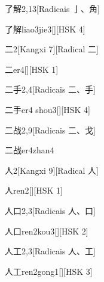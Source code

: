 \begin{entry}{了解}{2,13}[Radicais ⼅、⾓]
  \begin{phonetics}{了解}{liao3jie3}[][HSK 4]
  \end{phonetics}
\end{entry}

\begin{entry}{二}{2}[Kangxi 7][Radical ⼆]
  \begin{phonetics}{二}{er4}[][HSK 1]
  \end{phonetics}
\end{entry}

\begin{entry}{二手}{2,4}[Radicais ⼆、⼿]
  \begin{phonetics}{二手}{er4 shou3}[][HSK 4]
  \end{phonetics}
\end{entry}

\begin{entry}{二战}{2,9}[Radicais ⼆、⼽]
  \begin{phonetics}{二战}{er4zhan4}
  \end{phonetics}
\end{entry}

\begin{entry}{人}{2}[Kangxi 9][Radical ⼈]
  \begin{phonetics}{人}{ren2}[][HSK 1]
  \end{phonetics}
\end{entry}

\begin{entry}{人口}{2,3}[Radicais ⼈、⼝]
  \begin{phonetics}{人口}{ren2kou3}[][HSK 2]
  \end{phonetics}
\end{entry}

\begin{entry}{人工}{2,3}[Radicais ⼈、⼯]
  \begin{phonetics}{人工}{ren2gong1}[][HSK 3]
  \end{phonetics}
\end{entry}

